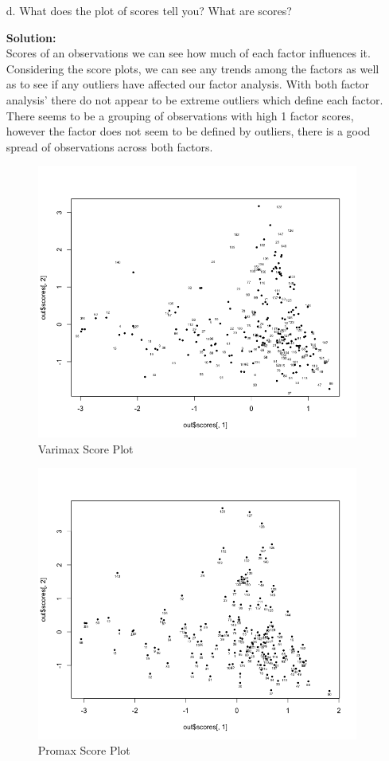 \documentclass[12pt]{article}
\makeatletter
\theoremstyle{homework}
\newenvironment{exercise}[1]
{\def\@currentlabel{#1}\exercisecore}
{\endexercisecore}
\newcommand{\localhead}[1]{\par\smallskip\noindent\textbf{#1}\nobreak\\}%
\newcommand\solution{\localhead{Solution:}}
\makeatother
\begin{document}
\begin{exercise}{1}
\begin{enumerate}
    \item[d.] What does the plot of scores tell you? What are scores?\\
    \solution Scores of an observations we can see how much of each factor influences it. Considering the score plots, we can see any trends among the factors as well as to see if any outliers 
    have affected our factor analysis. With both factor analysis' there do not appear to be extreme outliers which define each factor. There seems to be a grouping of observations with high 1 factor scores, however the 
    factor does not seem to be defined by outliers, there is a good spread of observations across both factors. 
      \begin{figure}[H]
        \begin{center}
          \caption{Varimax Score Plot}
        \includegraphics[width = .75\textwidth]{Rplot.png}
        \end{center}
      \end{figure}

      \begin{figure}[H]
        \begin{center}
          \caption{Promax Score Plot}
        \includegraphics[width = .75\textwidth]{Rplot01.png}
        \end{center}
      \end{figure}
    \end{enumerate}
\end{exercise}
\vspace{1in} 
\end{document}
